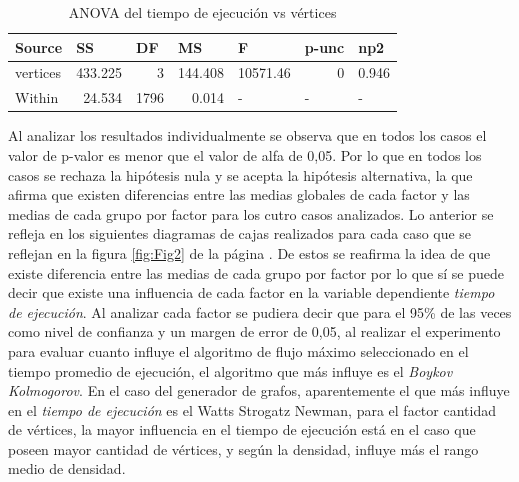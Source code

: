 \documentclass{article}
\begin{document}
\begin{table}[htbp]
  \centering
  \caption{ANOVA del tiempo de ejecución vs vértices}
    \begin{tabular}{lrrrlll}
    \toprule
    \textbf{Source} & \multicolumn{1}{l}{\textbf{SS}} & \multicolumn{1}{l}{\textbf{DF}} & \multicolumn{1}{l}{\textbf{MS}} & \textbf{F} & \textbf{p-unc} & \textbf{np2} \\
    \midrule
    vertices & 433.225 & 3     & 144.408 & \multicolumn{1}{r}{10571.46} & \multicolumn{1}{r}{0} & \multicolumn{1}{r}{0.946} \\
    Within & 24.534 & 1796  & 0.014 & -     & -     & - \\
    \bottomrule
    \end{tabular}%
  \label{tab:addlabel}%
\end{table}%

Al analizar los resultados individualmente se observa que en todos los casos el valor de p-valor es menor que el valor de alfa de 0,05. Por lo que en todos los casos se rechaza la hipótesis nula y se acepta la hipótesis alternativa, la que afirma que existen diferencias entre las medias globales de cada factor y las medias de cada grupo por factor para los cutro casos analizados. Lo anterior se refleja en los siguientes diagramas de cajas realizados para cada caso que se reflejan en la figura \ref{fig:Fig2} de la página \pageref{fig:Fig2} .
De estos se reafirma la idea de que existe diferencia entre las medias de cada grupo por factor por lo que sí se puede decir que existe una influencia de cada factor en la variable dependiente \textit{tiempo de ejecución}. Al analizar cada factor se pudiera decir que para el 95\% de las veces como nivel de confianza y un margen de error de 0,05, al realizar el experimento para evaluar cuanto influye el algoritmo de flujo máximo seleccionado en el tiempo promedio de ejecución, el algoritmo que más influye es el \textit{Boykov Kolmogorov}. En el caso del generador de grafos, aparentemente el que más influye en el \textit{tiempo de ejecución} es el Watts Strogatz Newman, para el factor cantidad de vértices, la mayor influencia en el tiempo de ejecución está en el caso que poseen mayor cantidad de vértices, y según la densidad, influye más el rango medio de densidad.   
   
\end{document}
